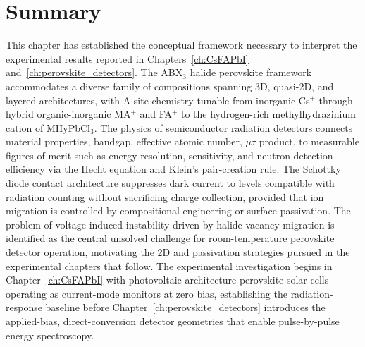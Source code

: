 \section{Summary}

This chapter has established the conceptual framework necessary to
interpret the experimental results reported in Chapters~\ref{ch:CsFAPbI}
and~\ref{ch:perovskite_detectors}.  The ABX$_3$ halide perovskite framework
accommodates a diverse family of compositions spanning 3D, quasi-2D, and
layered architectures, with A-site chemistry tunable from inorganic Cs$^+$
through hybrid organic-inorganic MA$^+$ and FA$^+$ to the
hydrogen-rich methylhydrazinium cation of MHyPbCl$_3$.  The physics of
semiconductor radiation detectors connects material properties,
bandgap, effective atomic number, $\mu\tau$ product, to measurable
figures of merit such as energy resolution, sensitivity, and neutron
detection efficiency via the Hecht equation and Klein's pair-creation
rule.  The Schottky diode contact architecture suppresses dark current
to levels compatible with radiation counting without sacrificing charge
collection, provided that ion migration is controlled by compositional
engineering or surface passivation.  The problem of voltage-induced
instability driven by halide vacancy migration is identified as the
central unsolved challenge for room-temperature perovskite detector
operation, motivating the 2D and passivation strategies pursued in
the experimental chapters that follow.  The experimental investigation
begins in Chapter~\ref{ch:CsFAPbI} with photovoltaic-architecture
perovskite solar cells operating as current-mode monitors at zero bias,
establishing the radiation-response baseline before
Chapter~\ref{ch:perovskite_detectors} introduces the applied-bias,
direct-conversion detector geometries that enable pulse-by-pulse energy
spectroscopy.